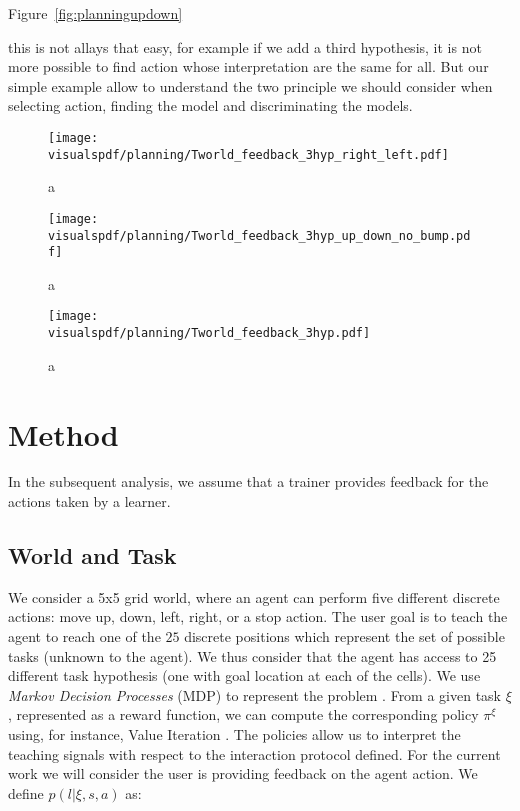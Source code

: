 Figure~\ref{fig:planningupdown} 

this is not allays that easy, for example if we add a third hypothesis, it is not more possible to find action whose interpretation are the same for all. But our simple example allow to understand the two principle we should consider when selecting action, finding the model and discriminating the models.


\begin{figure}[!ht]
  \centering
  \texttt{[image: \\visualspdf/planning/Tworld\_feedback\_3hyp\_right\_left.pdf]}
  \caption{a}
  \label{fig:planning3hyprightleft}
\end{figure}

\begin{figure}[!ht]
  \centering
  \texttt{[image: \\visualspdf/planning/Tworld\_feedback\_3hyp\_up\_down\_no\_bump.pdf]}
  \caption{a}
  \label{fig:planning3hypupdown}
\end{figure}

\begin{figure}[!ht]
  \centering
  \texttt{[image: \\visualspdf/planning/Tworld\_feedback\_3hyp.pdf]}
  \caption{a}
  \label{fig:planning3hyp}
\end{figure}





\section{Method}

In the subsequent analysis, we assume that a trainer provides feedback for the actions taken by a learner. 

\subsection{World and Task}
We consider a 5x5 grid world, where an agent can perform five different discrete actions: move up, down, left, right, or a stop action. The user goal is to teach the agent to reach one of the $25$ discrete positions which represent the set of possible tasks (unknown to the agent). We thus consider that the agent has access to 25 different task hypothesis (one with goal location at each of the cells). We use \textit{Markov Decision Processes} (MDP) to represent the problem \cite{sutton1998reinforcement}. From a given task $\xi$, represented as a reward function, we can compute the corresponding policy $\pi^{\xi}$ using, for instance, Value Iteration \cite{sutton1998reinforcement}. The policies allow us to interpret the teaching signals with respect to the interaction protocol defined. For the current work we will consider the user is providing feedback on the agent action. We define $p(l | \xi, s, a)$ as:

